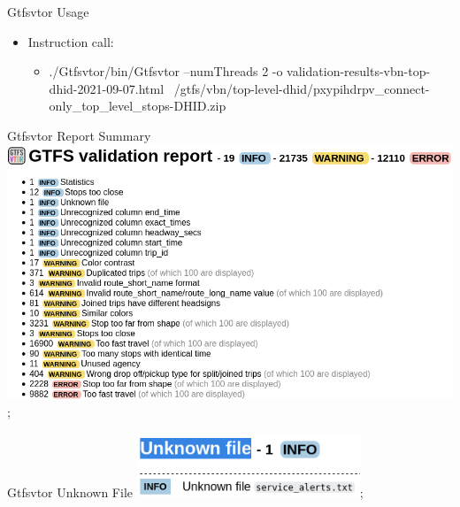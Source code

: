 
\begin{frame}{Gtfsvtor Usage}
  \begin{itemize}
  \item Instruction call:
    \begin{itemize}
    \item ./Gtfsvtor/bin/Gtfsvtor --numThreads 2 -o validation-results-vbn-top-dhid-2021-09-07.html ~/gtfs/vbn/top-level-dhid/pxypihdrpv\_connect-only\_top\_level\_stops-DHID.zip
    \end{itemize}
  \end{itemize}
\end{frame}

\begin{frame}{Gtfsvtor Report Summary}
\includegraphics[width=0.95\paperwidth]{gtfs-validation/gtfsvtor-report-vbn-top-dhid.png};
\end{frame}

\begin{frame}{Gtfsvtor Unknown File}
\includegraphics[width=0.5\textwidth]{gtfs-validation/gtfsvtor-report-vbn-top-dhid-unknown-file.png};
\end{frame}

